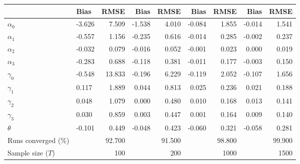 
\begin{tabular}[t]{llrrrrrrr}
\toprule
  & Bias & RMSE & Bias & RMSE & Bias & RMSE & Bias & RMSE\\
\midrule
$\alpha_{0}$ & -3.626 & 7.509 & -1.538 & 4.010 & -0.084 & 1.855 & -0.014 & 1.541\\
$\alpha_{1}$ & -0.557 & 1.156 & -0.235 & 0.616 & -0.014 & 0.285 & -0.002 & 0.237\\
$\alpha_{2}$ & -0.032 & 0.079 & -0.016 & 0.052 & -0.001 & 0.023 & 0.000 & 0.019\\
$\alpha_{3}$ & -0.283 & 0.688 & -0.118 & 0.381 & -0.011 & 0.177 & -0.003 & 0.150\\
$\gamma_{0}$ & -0.548 & 13.833 & -0.196 & 6.229 & -0.119 & 2.052 & -0.107 & 1.656\\
$\gamma_{1}$ & 0.117 & 1.889 & 0.044 & 0.813 & 0.025 & 0.236 & 0.021 & 0.188\\
$\gamma_{2}$ & 0.048 & 1.079 & 0.000 & 0.480 & 0.010 & 0.168 & 0.013 & 0.141\\
$\gamma_{3}$ & 0.030 & 0.859 & 0.003 & 0.447 & 0.001 & 0.164 & 0.009 & 0.140\\
$\theta$ & -0.101 & 0.449 & -0.048 & 0.423 & -0.060 & 0.321 & -0.058 & 0.281\\
Runs converged (\%) &  & 92.700 &  & 91.500 &  & 98.800 &  & 99.900\\
Sample size ($T$) &  & 100 &  & 200 &  & 1000 &  & 1500\\
\bottomrule
\end{tabular}
